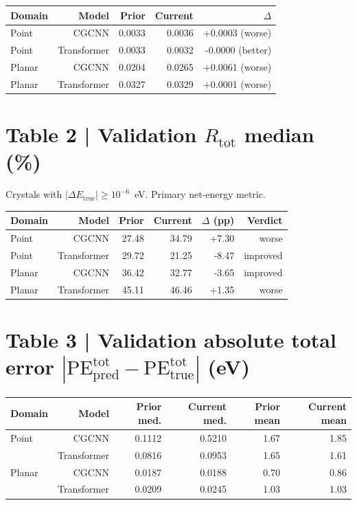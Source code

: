 \documentclass[11pt,a4paper]{article}
\begin{document}
\begin{center}
\small
\begin{tabular}{l r r r r}
  \toprule
  Domain & Model & Prior & Current & $\Delta$ \\
  \midrule
  Point  & CGCNN       & 0.0033 & 0.0036 & +0.0003 (worse) \\
  Point  & Transformer & 0.0033 & 0.0032 & -0.0000 (better) \\
  Planar & CGCNN       & 0.0204 & 0.0265 & +0.0061 (worse) \\
  Planar & Transformer & 0.0327 & 0.0329 & +0.0001 (worse) \\
  \bottomrule
\end{tabular}
\end{center}

\section*{Table 2 | Validation $R_{\mathrm{tot}}$ median (\%)}

Crystals with $|\Delta E_{\mathrm{true}}|\ge 10^{-6}$~eV. Primary net-energy metric.

\begin{center}
\small
\begin{tabular}{l r r r r r}
  \toprule
  Domain & Model & Prior & Current & $\Delta$ (pp) & Verdict \\
  \midrule
  Point  & CGCNN       & 27.48 & 34.79 & +7.30 & worse \\
  Point  & Transformer & 29.72 & 21.25 & -8.47 & improved \\
  Planar & CGCNN       & 36.42 & 32.77 & -3.65 & improved \\
  Planar & Transformer & 45.11 & 46.46 & +1.35 & worse \\
  \bottomrule
\end{tabular}
\end{center}

\section*{Table 3 | Validation absolute total error $|\mathrm{PE}_{\mathrm{pred}}^{\mathrm{tot}}-\mathrm{PE}_{\mathrm{true}}^{\mathrm{tot}}|$ (eV)}

\begin{center}
\small
\begin{tabular}{l r r r r r}
  \toprule
  Domain & Model & Prior med. & Current med. & Prior mean & Current mean \\
  \midrule
  Point  & CGCNN & 0.1112 & 0.5210 & 1.67 & 1.85 \\
  & Transformer & 0.0816 & 0.0953 & 1.65 & 1.61 \\
  Planar & CGCNN & 0.0187 & 0.0188 & 0.70 & 0.86 \\
  & Transformer & 0.0209 & 0.0245 & 1.03 & 1.03 \\
  \bottomrule
\end{tabular}
\end{center}
\end{document}
